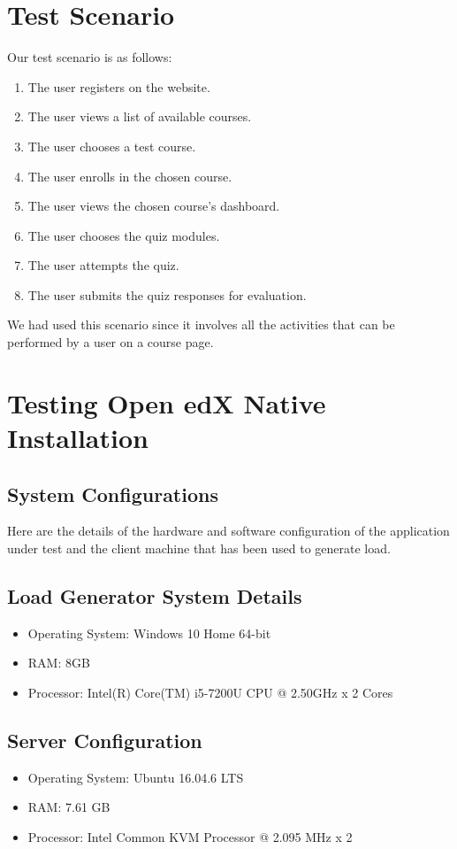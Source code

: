 \documentclass[12pt]{report}
\begin{document}
\section{Test Scenario}
Our test scenario is as follows:
\begin{enumerate}
	\item The user registers on the website.
	\item The user views a list of available courses.
	\item The user chooses a test course.
	\item The user enrolls in the chosen course.
	\item The user views the chosen course's dashboard.
	\item The user chooses the quiz modules.
	\item The user attempts the quiz.
	\item The user submits the quiz responses for evaluation.
\end{enumerate}
We had used this scenario since it involves all the activities that can be performed by a user on a course page.
\par
\section{Testing Open edX Native Installation}
\subsection{System Configurations}
Here are the details of the hardware and software configuration of the application under test and the client machine that has been used to generate load.
\subsection{Load Generator System Details}
\begin{itemize}
	\item Operating System: Windows 10 Home 64-bit
	\item RAM: 8GB
	\item Processor: Intel(R) Core(TM) i5-7200U CPU @ 2.50GHz x 2 Cores
\end{itemize}
\subsection{Server Configuration}
\begin{itemize}
	\item Operating System: Ubuntu 16.04.6 LTS
	\item RAM: 7.61 GB
	\item Processor: Intel Common KVM Processor @ 2.095 MHz x 2
\end{itemize}
\end{document}
